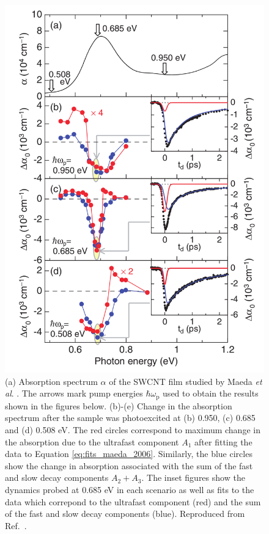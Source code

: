\begin{figure}[H]
	\centering
	\includegraphics[scale=0.2]{images/chapter_prior_works/dtt_maeda_2006}
	\caption{(a) Absorption spectrum $\alpha$ of the SWCNT film studied by Maeda \textit{et al}. \cite{maeda2006gigantic}. The arrows mark pump energies $\hbar \omega_\text{p}$ used to obtain the results shown in the figures below. (b)-(e) Change in the absorption spectrum after the sample was photoexcited at (b) 0.950, (c) 0.685 and (d) 0.508 eV. The red circles correspond to maximum change in the absorption due to the ultrafast component $A_1$ after fitting the data to Equation \eqref{eq:fits_maeda_2006}. Similarly, the blue circles show the change in absorption associated with the sum of the fast and slow decay components $A_2 + A_3$. The inset figures show the dynamics probed at 0.685 eV in each scenario as well as fits to the data which correpond to the ultrafast component (red) and the sum of the fast and slow decay components (blue). Reproduced from Ref.\ \cite{maeda2006gigantic}.}
	\label{fig:dtt_maeda_2006}
\end{figure}

